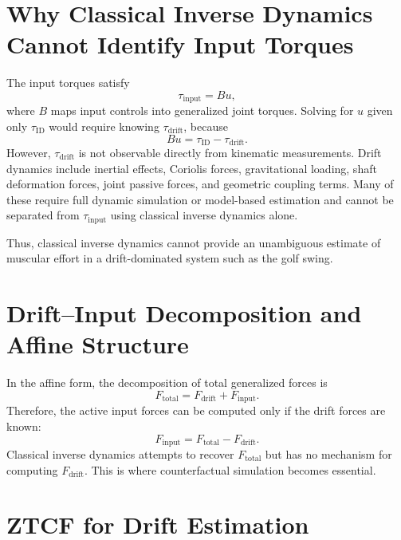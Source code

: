\documentclass[12pt]{article}
\begin{document}
\section{Why Classical Inverse Dynamics Cannot Identify Input Torques}

The input torques satisfy
\begin{equation}
\tau_{\mathrm{input}} = Bu,
\end{equation}
where $B$ maps input controls into generalized joint torques. Solving for $u$ given only $\tau_{\mathrm{ID}}$ would require knowing $\tau_{\mathrm{drift}}$, because
\begin{equation}
Bu = \tau_{\mathrm{ID}} - \tau_{\mathrm{drift}}.
\end{equation}
However, $\tau_{\mathrm{drift}}$ is not observable directly from kinematic measurements. Drift dynamics include inertial effects, Coriolis forces, gravitational loading, shaft deformation forces, joint passive forces, and geometric coupling terms. Many of these require full dynamic simulation or model-based estimation and cannot be separated from $\tau_{\mathrm{input}}$ using classical inverse dynamics alone.

Thus, classical inverse dynamics cannot provide an unambiguous estimate of muscular effort in a drift-dominated system such as the golf swing.

\section{Drift--Input Decomposition and Affine Structure}

In the affine form, the decomposition of total generalized forces is
\begin{equation}
F_{\mathrm{total}} = F_{\mathrm{drift}} + F_{\mathrm{input}}.
\end{equation}
Therefore, the active input forces can be computed only if the drift forces are known:
\begin{equation}
F_{\mathrm{input}} = F_{\mathrm{total}} - F_{\mathrm{drift}}.
\end{equation}
Classical inverse dynamics attempts to recover $F_{\mathrm{total}}$ but has no mechanism for computing $F_{\mathrm{drift}}$. This is where counterfactual simulation becomes essential.

\section{ZTCF for Drift Estimation}
\end{document}
